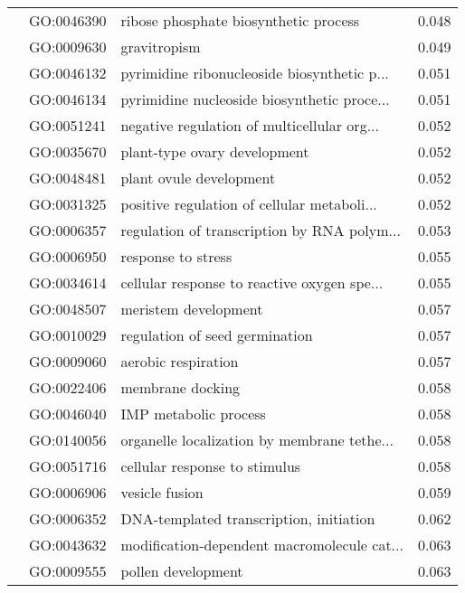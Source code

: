 \begin{longtable}{lllr}
   & GO:0046390 &        ribose phosphate biosynthetic process &         0.048 \\
   & GO:0009630 &                                 gravitropism &         0.049 \\
   & GO:0046132 &  pyrimidine ribonucleoside biosynthetic p... &         0.051 \\
   & GO:0046134 &  pyrimidine nucleoside biosynthetic proce... &         0.051 \\
   & GO:0051241 &  negative regulation of multicellular org... &         0.052 \\
   & GO:0035670 &                 plant-type ovary development &         0.052 \\
   & GO:0048481 &                      plant ovule development &         0.052 \\
   & GO:0031325 &  positive regulation of cellular metaboli... &         0.052 \\
   & GO:0006357 &  regulation of transcription by RNA polym... &         0.053 \\
   & GO:0006950 &                           response to stress &         0.055 \\
   & GO:0034614 &  cellular response to reactive oxygen spe... &         0.055 \\
   & GO:0048507 &                         meristem development &         0.057 \\
   & GO:0010029 &               regulation of seed germination &         0.057 \\
   & GO:0009060 &                          aerobic respiration &         0.057 \\
   & GO:0022406 &                             membrane docking &         0.058 \\
   & GO:0046040 &                        IMP metabolic process &         0.058 \\
   & GO:0140056 &  organelle localization by membrane tethe... &         0.058 \\
   & GO:0051716 &                cellular response to stimulus &         0.058 \\
   & GO:0006906 &                               vesicle fusion &         0.059 \\
   & GO:0006352 &      DNA-templated transcription, initiation &         0.062 \\
   & GO:0043632 &  modification-dependent macromolecule cat... &         0.063 \\
   & GO:0009555 &                           pollen development &         0.063 \\

\end{longtable}
